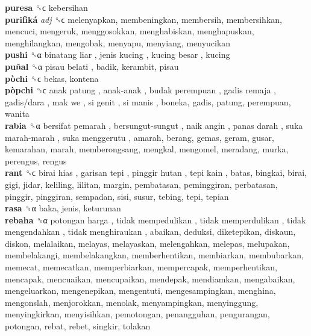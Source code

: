 \textbf{puresa} ␝ϲ  kebersihan  \\
\textbf{purifiká} \emph{adj}  ␝ϲ  melenyapkan, membeningkan, membersih, membersihkan, mencuci, mengeruk, menggosokkan, menghabiskan, menghapuskan, menghilangkan, mengobak, menyapu, menyiang, menyucikan  \\
\textbf{pushi} ␝α   binatang liar ,  jenis kucing ,  kucing besar , kucing  \\
\textbf{puñal} ␝α   pisau belati , badik, kerambit, pisau  \\
\textbf{pòchi} ␝ϲ  bekas, kontena  \\
\textbf{pòpchi} ␝ϲ   anak patung ,  anak-anak ,  budak perempuan ,  gadis remaja ,  gadis/dara ,  mak we ,  si genit ,  si manis , boneka, gadis, patung, perempuan, wanita  \\
\textbf{rabia} ␝α   bersifat pemarah ,  bersungut-sungut ,  naik angin ,  panas darah ,  suka marah-marah ,  suka menggerutu , amarah, berang, gemas, geram, gusar, kemarahan, marah, memberongsang, mengkal, mengomel, meradang, murka, perengus, rengus  \\
\textbf{rant} ␝ϲ   birai hias ,  garisan tepi ,  pinggir hutan ,  tepi kain , batas, bingkai, birai, gigi, jidar, keliling, lilitan, margin, pembatasan, peminggiran, perbatasan, pinggir, pinggiran, sempadan, sisi, susur, tebing, tepi, tepian  \\
\textbf{rasa} ␝α  baka, jenis, keturunan  \\
\textbf{rebaha} ␝α   potongan harga ,  tidak mempedulikan ,  tidak memperdulikan ,  tidak mengendahkan ,  tidak menghiraukan , abaikan, deduksi, diketepikan, diskaun, diskon, melalaikan, melayas, melayaskan, melengahkan, melepas, melupakan, membelakangi, membelakangkan, memberhentikan, membiarkan, membubarkan, memecat, memecatkan, memperbiarkan, mempercapak, memperhentikan, mencapak, mencuaikan, mencupaikan, mendepak, mendiamkan, mengabaikan, mengeluarkan, mengenepikan, mengentuti, mengesampingkan, menghina, mengonslah, menjorokkan, menolak, menyampingkan, menyinggung, menyingkirkan, menyisihkan, pemotongan, penangguhan, pengurangan, potongan, rebat, rebet, singkir, tolakan  \\
